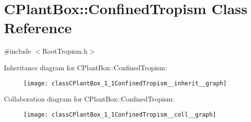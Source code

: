\hypertarget{classCPlantBox_1_1ConfinedTropism}{}\section{C\+Plant\+Box\+:\+:Confined\+Tropism Class Reference}
\label{classCPlantBox_1_1ConfinedTropism}


{\ttfamily \#include $<$Root\+Tropism.\+h$>$}



Inheritance diagram for C\+Plant\+Box\+:\+:Confined\+Tropism\+:\nopagebreak
\begin{figure}[H]
\begin{center}
\leavevmode
\texttt{[image: classCPlantBox\_1\_1ConfinedTropism\_\_inherit\_\_graph]}
\end{center}
\end{figure}


Collaboration diagram for C\+Plant\+Box\+:\+:Confined\+Tropism\+:\nopagebreak
\begin{figure}[H]
\begin{center}
\leavevmode
\texttt{[image: classCPlantBox\_1\_1ConfinedTropism\_\_coll\_\_graph]}
\end{center}
\end{figure}
